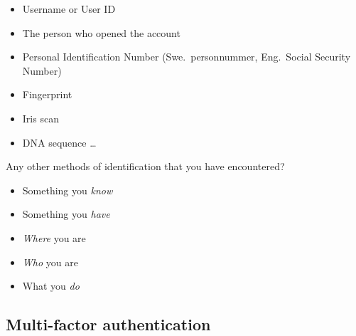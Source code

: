 \begin{frame}
  \begin{example}
    \begin{itemize}
      \item Username or User ID
      \item The person who opened the account
      \item Personal Identification Number (Swe.\ personnummer, Eng.\ Social 
        Security Number)

        \pause{}

      \item Fingerprint
      \item Iris scan
      \item DNA sequence \dots
    \end{itemize}
  \end{example}

  \pause{}

  \begin{exercise}
    Any other methods of identification that you have encountered?
  \end{exercise}
\end{frame}

\begin{frame}
  \begin{example}
    \begin{itemize}
      \item Something you \emph{know}

        \pause{}

      \item Something you \emph{have}

        \pause{}

      \item \emph{Where} you are

        \pause{}

      \item \emph{Who} you are
      \item What you \emph{do}
    \end{itemize}
  \end{example}
\end{frame}

\subsection{Multi-factor authentication}

